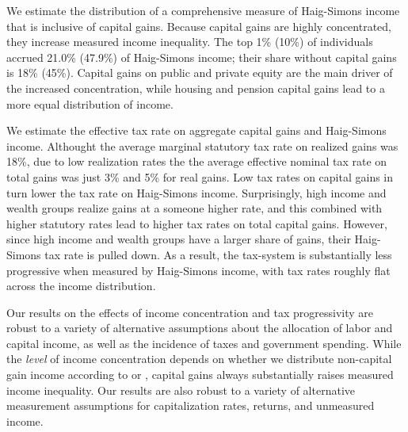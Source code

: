 \documentclass[12pt]{article}
\begin{document}
We estimate the distribution of a comprehensive measure of Haig-Simons income that is inclusive of capital gains. Because capital gains are highly concentrated, they increase measured income inequality. The top 1\% (10\%) of individuals accrued 21.0\% (47.9\%) of Haig-Simons income; their share without capital gains is 18\% (45\%). Capital gains on public and private equity are the main driver of the increased concentration, while housing and pension capital gains lead to a more equal distribution of income. 

We estimate the effective tax rate on aggregate capital gains and Haig-Simons income. Althought the average marginal statutory tax rate on realized gains was 18\%, due to low realization rates the the average effective nominal tax rate on total gains was just 3\% and 5\% for real gains.  Low tax rates on capital gains in turn lower the tax rate on Haig-Simons income. Surprisingly, high income and wealth groups realize gains at a someone higher rate, and this combined with higher statutory rates lead to higher tax rates on total capital gains. However, since high income and wealth groups have a larger share of gains, their Haig-Simons tax rate is pulled down.  As a result, the tax-system is substantially less progressive when measured by Haig-Simons income, with tax rates roughly flat across the income distribution. 

Our results on the effects of income concentration and tax progressivity are robust to a variety of alternative assumptions about the allocation of labor and capital income, as well as the incidence of taxes and government spending. While the \textit{level} of income concentration depends on whether we distribute non-capital gain income according to \citet{piketty2016distributional} or \citet{auten2024income}, capital gains always substantially raises measured income inequality. Our results are also robust to a variety of alternative measurement assumptions for capitalization rates, returns, and unmeasured income.

\end{document}
